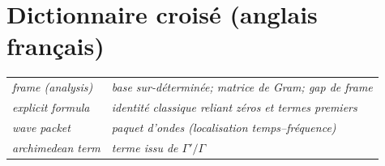 \section*{Dictionnaire croisé (anglais \textrightarrow{} français)}
\begin{tabular}{p{.28\linewidth} p{.64\linewidth}}
\textit{frame (analysis)} & \textit{base sur-déterminée; matrice de Gram; gap de frame}\\
\textit{explicit formula} & \textit{identité classique reliant zéros et termes premiers}\\
\textit{wave packet} & \textit{paquet d’ondes (localisation temps–fréquence)}\\
\textit{archimedean term} & \textit{terme issu de $\Gamma'/\Gamma$}\\
\end{tabular}
